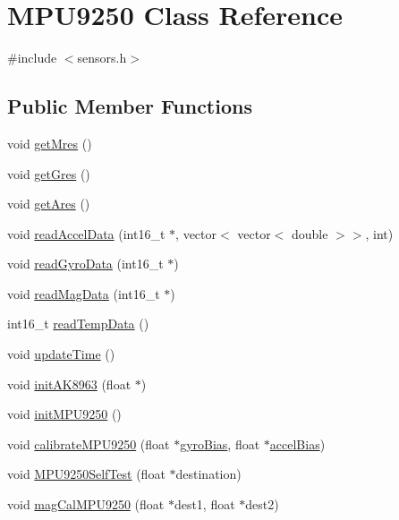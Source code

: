 \hypertarget{classMPU9250}{}\section{M\+P\+U9250 Class Reference}
\label{classMPU9250}


{\ttfamily \#include $<$sensors.\+h$>$}

\subsection*{Public Member Functions}
\begin{DoxyCompactItemize}
\item 
void \hyperlink{classMPU9250_ab6b113da9b2fb006eb44dc8078e699c5}{get\+Mres} ()
\item 
void \hyperlink{classMPU9250_afd804ec9bd68961fc0084af461104304}{get\+Gres} ()
\item 
void \hyperlink{classMPU9250_a1c7dba3645913bf97f8b47d2bd4af2b0}{get\+Ares} ()
\item 
void \hyperlink{classMPU9250_a66dc74fdb59049f61e1e86e4b71aabac}{read\+Accel\+Data} (int16\+\_\+t $\ast$, vector$<$ vector$<$ double $>$$>$, int)
\item 
void \hyperlink{classMPU9250_a7f0f6be23ed65146391cf91e4739ccc0}{read\+Gyro\+Data} (int16\+\_\+t $\ast$)
\item 
void \hyperlink{classMPU9250_a5d3589bd83a003da56546474dd9ca519}{read\+Mag\+Data} (int16\+\_\+t $\ast$)
\item 
int16\+\_\+t \hyperlink{classMPU9250_a3ab318a519e0f85a38d0e40d4bedc89f}{read\+Temp\+Data} ()
\item 
void \hyperlink{classMPU9250_a39e17cffe3de219d3f991b6476833e40}{update\+Time} ()
\item 
void \hyperlink{classMPU9250_aab7b6d912fdc88c4fedfad90abe2aeab}{init\+A\+K8963} (float $\ast$)
\item 
void \hyperlink{classMPU9250_a03803202142ac461867daa9dd06fdd80}{init\+M\+P\+U9250} ()
\item 
void \hyperlink{classMPU9250_aeac1ae4402a4eb9a74bea5ad8af929c1}{calibrate\+M\+P\+U9250} (float $\ast$\hyperlink{classMPU9250_a4fc2232b3fdbd61bc1024c86842ddf9a}{gyro\+Bias}, float $\ast$\hyperlink{classMPU9250_a7b0e6389baccd5592c95cae9d24d1317}{accel\+Bias})
\item 
void \hyperlink{classMPU9250_ad3bbdef687191a70354ee2f900352993}{M\+P\+U9250\+Self\+Test} (float $\ast$destination)
\item 
void \hyperlink{classMPU9250_ad2ebbfb1d321b9c3312f4ae298214020}{mag\+Cal\+M\+P\+U9250} (float $\ast$dest1, float $\ast$dest2)
$$
\end{DoxyCompactItemize}
